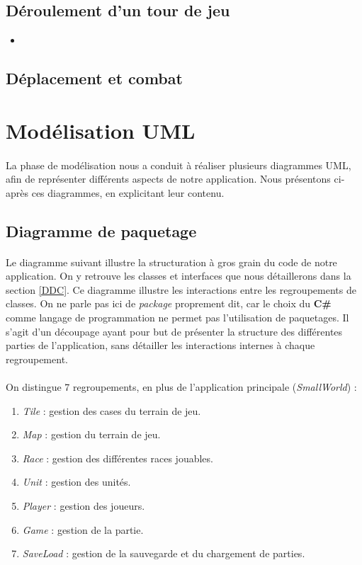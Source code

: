 \documentclass[a4paper]{article}
\begin{document}
\subsection{Déroulement d'un tour de jeu}

\begin{itemize}
    \item 
\end{itemize}

\subsection{Déplacement et combat}


\section{Modélisation UML}
\paragraph{}
La phase de modélisation nous a conduit à réaliser plusieurs diagrammes UML, afin de représenter différents aspects de notre application. Nous présentons ci-après ces diagrammes, en explicitant leur contenu.

\subsection{Diagramme de paquetage}
\paragraph{}
Le diagramme suivant illustre la structuration à gros grain du code de notre application. On y retrouve les classes et interfaces que nous détaillerons dans la section \ref{DDC}. Ce diagramme illustre les interactions entre les regroupements de classes. On ne parle pas ici de \textit{package} proprement dit, car le choix du \textbf{C\#} comme langage de programmation ne permet pas l'utilisation de paquetages. Il s'agit d'un découpage ayant pour but de présenter la structure des différentes parties de l'application, sans détailler les interactions internes à chaque regroupement.

\paragraph{}
On distingue 7 regroupements, en plus de l'application principale (\textit{SmallWorld}) :
\begin{enumerate}
\item \textit{Tile} : gestion des cases du terrain de jeu.
\item \textit{Map} : gestion du terrain de jeu.
\item \textit{Race} : gestion des différentes races jouables.
\item \textit{Unit} : gestion des unités.
\item \textit{Player} : gestion des joueurs.
\item \textit{Game} : gestion de la partie.
\item \textit{SaveLoad} : gestion de la sauvegarde et du chargement de parties.
\end{enumerate}
\end{document}
